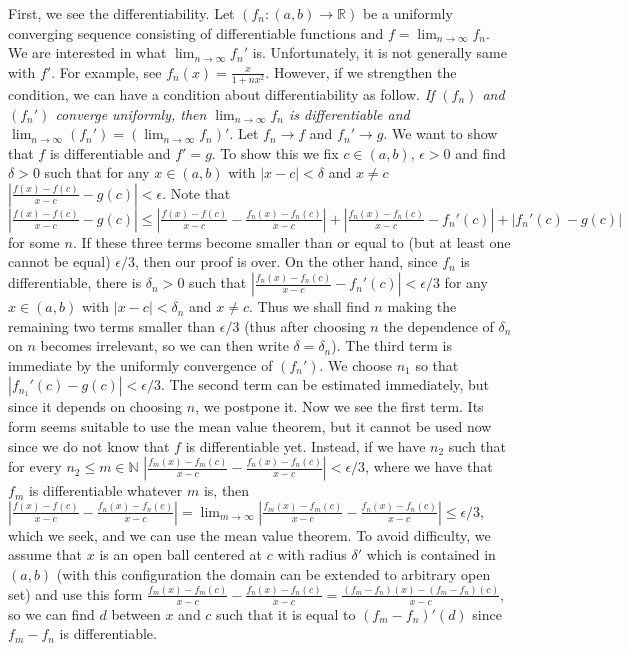 \documentclass{article}
\newcommand{\NaN}{\mathbb{N}}
\newcommand{\ReR}{\mathbb{R}}
\begin{document}
First, we see the differentiability.
Let $(f_n : (a, b) \to \ReR)$ be a uniformly converging sequence consisting of differentiable functions and $f = \lim_{n \to \infty} f_n$.
We are interested in what $\lim_{n \to \infty} f_n'$ is.
Unfortunately, it is not generally same with $f'$.
For example, see $f_n(x) = \frac{x}{1 + nx^2}$.
However, if we strengthen the condition, we can have a condition about differentiability as follow.
\textit{If $(f_n)$ and $(f_n')$ converge uniformly, then $\lim_{n \to \infty} f_n$ is differentiable and $\lim_{n \to \infty} (f_n') = (\lim_{n \to \infty} f_n)'$}.
Let $f_n \to f$ and $f_n' \to g$.
We want to show that $f$ is differentiable and $f' = g$.
To show this we fix $c \in (a, b)$, $\epsilon > 0$ and find $\delta > 0$ such that for any $x \in (a, b)$ with $|x - c| < \delta$ and $x \ne c$ $|\frac{f(x) - f(c)}{x -c} - g(c)| < \epsilon$.
Note that $|\frac{f(x) - f(c)}{x -c} - g(c)| \le |\frac{f(x) - f(c)}{x -c} - \frac{f_n(x) - f_n(c)}{x -c}| + |\frac{f_n(x) - f_n(c)}{x -c} - f_n'(c)| + |f_n'(c) - g(c)|$ for some $n$.
If these three terms become smaller than or equal to (but at least one cannot be equal) $\epsilon/3$, then our proof is over.
On the other hand, since $f_n$ is differentiable, there is $\delta_n > 0$ such that $|\frac{f_n(x) - f_n(c)}{x -c} - f_n'(c)| < \epsilon/3$ for any $x \in (a, b)$ with $|x - c| < \delta_n$ and $x \ne c$.
Thus we shall find $n$ making the remaining two terms smaller than $\epsilon/3$ (thus after choosing $n$ the dependence of $\delta_n$ on $n$ becomes irrelevant, so we can then write $\delta = \delta_n$).
The third term is immediate by the uniformly convergence of $(f_n')$.
We choose $n_1$ so that $|f_{n_1}'(c) - g(c)| < \epsilon/3$.
The second term can be estimated immediately, but since it depends on choosing $n$, we postpone it.
Now we see the first term.
Its form seems suitable to use the mean value theorem, but it cannot be used now since we do not know that $f$ is differentiable yet.
Instead, if we have $n_2$ such that for every $n_2 \le m \in \NaN$ $|\frac{f_m(x) - f_m(c)}{x -c} - \frac{f_n(x) - f_n(c)}{x -c}| < \epsilon/3$, where we have that $f_m$ is differentiable whatever $m$ is, then $|\frac{f(x) - f(c)}{x -c} - \frac{f_n(x) - f_n(c)}{x -c}| = \lim_{m \to \infty} |\frac{f_m(x) - f_m(c)}{x -c} - \frac{f_n(x) - f_n(c)}{x -c}| \le \epsilon/3$, which we seek, and we can use the mean value theorem.
To avoid difficulty, we assume that $x$ is an open ball centered at $c$ with radius $\delta'$ which is contained in $(a, b)$ (with this configuration the domain can be extended to arbitrary open set) and use this form $\frac{f_m(x) - f_m(c)}{x -c} - \frac{f_n(x) - f_n(c)}{x -c} = \frac{(f_m - f_n)(x) - (f_m - f_n)(c)}{x - c}$, so we can find $d$ between $x$ and $c$ such that it is equal to $(f_m - f_n)'(d)$ since $f_m - f_n$ is differentiable.
\end{document}
